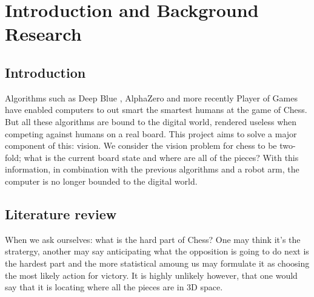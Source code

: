 \chapter{Introduction and Background Research}

\label{chapter1}

\section{Introduction}

Algorithms such as Deep Blue \cite{parikh1980adaptive}, AlphaZero \cite{} and more recently Player of Games\cite{}
have enabled computers to out smart the smartest humans at the game of Chess.
But all these algorithms are bound to the digital world, rendered useless when
competing against humans on a real board. This project aims to solve a major
component of this: vision.
We consider the vision problem for chess to be two-fold; what is the current board
state and where are all of the pieces?  With this information, in combination with the
previous algorithms and a robot arm, the computer is no longer bounded to the
digital world.

\section{Literature review}
When we ask ourselves: what is the hard part of Chess?  
One may think it's the stratergy, another may say anticipating what the opposition
is going to do next is the hardest part and the more statistical amoung us may formulate it
as choosing the most likely action for victory.  It is highly unlikely however, that one would say that it is locating
where all the pieces are in 3D space.

